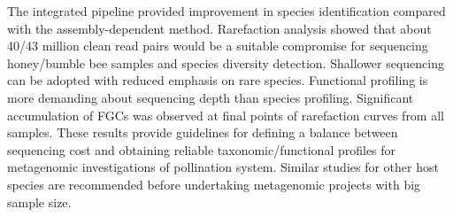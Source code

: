 \documentclass[11pt]{article}
\begin{document}
  The integrated pipeline provided improvement in species identification compared with the assembly-dependent method. 
  Rarefaction analysis showed that about 40/43 million clean read pairs would be a suitable compromise for sequencing honey/bumble bee samples and species diversity detection. 
  Shallower sequencing can be adopted with reduced emphasis on rare species. 
  Functional profiling is more demanding about sequencing depth than species profiling. 
  Significant accumulation of FGCs was observed at final points of rarefaction curves from all samples.  
  These results provide guidelines for defining a balance between sequencing cost and obtaining reliable taxonomic/functional profiles for metagenomic investigations of pollination system. 
  Similar studies for other host species are recommended before undertaking metagenomic projects with big sample size. 
\end{document}
